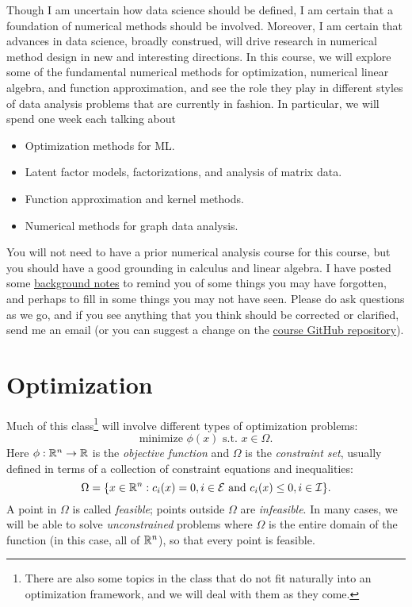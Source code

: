 \documentclass[12pt, leqno]{article} %
\begin{document}
Though I am uncertain how data science should be defined, I am certain
that a foundation of numerical methods should be involved.  Moreover,
I am certain that advances in data science, broadly construed, will
drive research in numerical method design in new and interesting
directions.  In this course, we will explore some of the fundamental
numerical methods for optimization, numerical linear algebra, and
function approximation, and see the role they play in different styles of
data analysis problems that are currently in fashion.  In particular,
we will spend one week each talking about
\begin{itemize}
\item Optimization methods for ML.
\item Latent factor models, factorizations, and analysis of
  matrix data.
\item Function approximation and kernel methods.
\item Numerical methods for graph data analysis.
\end{itemize}
You will not need to have a prior numerical analysis course for this
course, but you should have a good grounding in calculus and linear
algebra.  I have posted some
\href{http://www.cs.cornell.edu/~bindel/class/sjtu-summer18/lec/background.pdf}{background
  notes}
to remind you of some things you may have forgotten, and perhaps to
fill in some things you may not have seen.  Please do ask questions as
we go, and if you see anything that you think should be corrected or
clarified, send me an email (or you can suggest a change on the
\href{https://github.com/dbindel/sjtu-summer2018/}{course GitHub repository}).

\section{Optimization}

Much of this class\footnote{%
  There are also some topics in the class that do not fit naturally
  into an optimization framework, and we will deal with them as they come.
} will involve different types of optimization problems:
\begin{equation}
  \mbox{minimize } \phi(x) \mbox{ s.t. } x \in \Omega.
\end{equation}
Here $\phi : \mathbb{R}^n \rightarrow \mathbb{R}$ is the {\em objective function} and 
$\Omega$ is the {\em constraint set}, usually defined in terms of a
collection of constraint equations and inequalities:
\[
\Omega = \{ x \in \mathbb{R}^n :
  c_i(x) = 0, i \in \mathcal{E} \mbox{ and }
  c_i(x) \leq 0, i \in \mathcal{I} \}.
\]
A point in $\Omega$ is called {\em feasible}; points outside
$\Omega$ are {\em infeasible}.  In many cases, we will be able to
solve {\em unconstrained} problems where $\Omega$ is the entire domain of
the function (in this case, all of $\mathbb{R}^n$), so that every point is
feasible.
\end{document}
